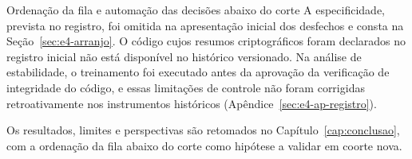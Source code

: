\begin{chapter}{Ordenação da fila e automação das decisões abaixo do corte}
A especificidade, prevista no registro, foi omitida na apresentação inicial dos desfechos e consta na Seção~\ref{sec:e4-arranjo}. O código cujos resumos criptográficos foram declarados no registro inicial não está disponível no histórico versionado. Na análise de estabilidade, o treinamento foi executado antes da aprovação da verificação de integridade do código, e essas limitações de controle não foram corrigidas retroativamente nos instrumentos históricos (Apêndice~\ref{sec:e4-ap-registro}).

Os resultados, limites e perspectivas são retomados no Capítulo~\ref{cap:conclusao}, com a ordenação da fila abaixo do corte como hipótese a validar em coorte nova.

\end{chapter}
